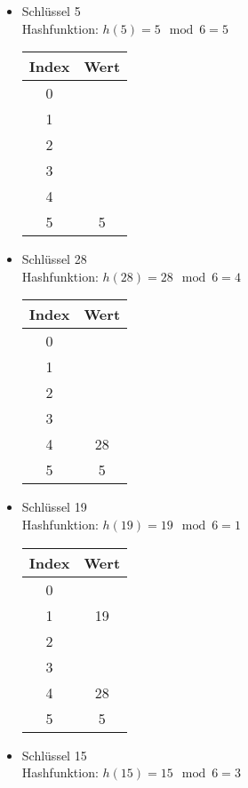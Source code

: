 \begin{multicols}{2}
\begin{itemize}
\item Schlüssel 5\\
Hashfunktion: $h(5) = 5 \mod 6=5$

\begin{center}
\begin{tabular}{c|c}
Index & Wert \\
\hline
0 & \\
1 & \\
2 & \\
3 & \\
4 & \\
5 & 5\\

\end{tabular}
\end{center}

\item Schlüssel 28\\
Hashfunktion: $h(28) = 28 \mod 6 = 4$

\begin{center}
\begin{tabular}{c|c}
Index & Wert \\
\hline
0 & \\
1 & \\
2 & \\
3 & \\
4 & 28\\
5 & 5\\

\end{tabular}
\end{center}

\item Schlüssel 19\\
Hashfunktion: $h(19) = 19 \mod 6 = 1$

\begin{center}
\begin{tabular}{c|c}
Index & Wert \\
\hline
0 & \\
1 & 19\\
2 & \\
3 & \\
4 & 28\\
5 & 5\\
\end{tabular}
\end{center}

\item Schlüssel 15\\
Hashfunktion: $h(15) = 15 \mod 6 = 3$


\end{itemize}
\end{multicols}
